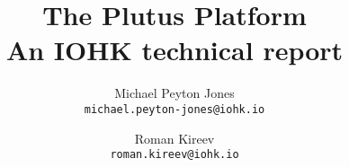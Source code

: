 \documentclass{article}
\theoremstyle{break}
\begin{document}
\title{The Plutus Platform \\
  {\large \sc An IOHK technical report}}
\date{}
\author{
  Michael Peyton Jones \\ {\small \texttt{michael.peyton-jones@iohk.io}} \\
  \and Roman Kireev \\ {\small \texttt{roman.kireev@iohk.io}}
}

\maketitle

\tableofcontents








\printglossaries
\glsaddall

\printbibliography[heading=bibintoc]
\end{document}
